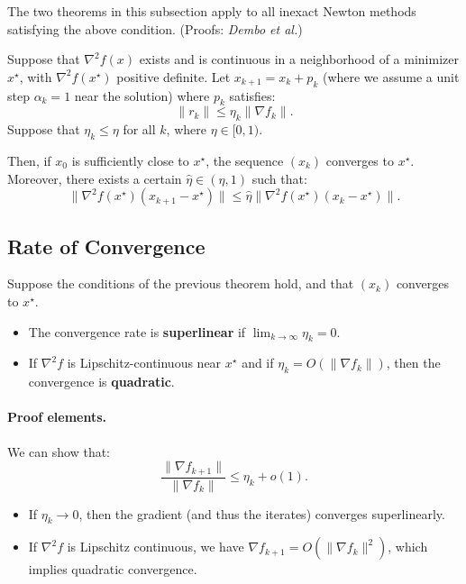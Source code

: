 The two theorems in this subsection apply to all inexact Newton methods satisfying the above condition.
(Proofs: \textit{Dembo et al.})

\begin{theoreme}
    Suppose that $\nabla^2 f(x)$ exists and is continuous in a neighborhood of a minimizer $x^\star$, with $\nabla^2 f(x^\star)$ positive definite.
    Let $x_{k+1} = x_k + p_k$ (where we assume a unit step $\alpha_k=1$ near the solution) where $p_k$ satisfies:
    \[
        \| r_k \| \le \eta_k \| \nabla f_k \|.
    \]
    Suppose that $\eta_k \le \eta$ for all $k$, where $\eta \in [0, 1)$.

    Then, if $x_0$ is sufficiently close to $x^\star$, the sequence $(x_k)$ converges to $x^\star$.
    Moreover, there exists a certain $\hat{\eta} \in (\eta, 1)$ such that:
    \[
        \| \nabla^2 f(x^\star) (x_{k+1} - x^\star) \| \le \hat{\eta} \| \nabla^2 f(x^\star) (x_k - x^\star) \|.
    \]
\end{theoreme}

\subsection{Rate of Convergence}

\begin{theoreme}
    Suppose the conditions of the previous theorem hold, and that $(x_k)$ converges to $x^\star$.
    \begin{itemize}
        \item The convergence rate is \textbf{superlinear} if $\lim_{k \to \infty} \eta_k = 0$.
        \item If $\nabla^2 f$ is Lipschitz-continuous near $x^\star$ and if $\eta_k = O(\| \nabla f_k \|)$, then the convergence is \textbf{quadratic}.
    \end{itemize}
\end{theoreme}

\paragraph{Proof elements.}
We can show that:
\[
    \frac{\| \nabla f_{k+1} \|}{\| \nabla f_k \|} \le \eta_k + o(1).
\]
\begin{itemize}
    \item If $\eta_k \to 0$, then the gradient (and thus the iterates) converges superlinearly.
    \item If $\nabla^2 f$ is Lipschitz continuous, we have $\nabla f_{k+1} = O(\| \nabla f_k \|^2)$, which implies quadratic convergence.
\end{itemize}

